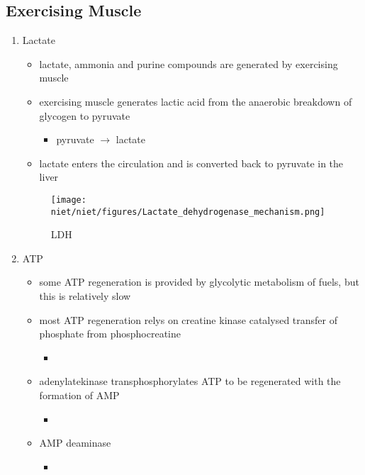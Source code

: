 \documentclass{scrartcl}
\begin{document}
\subsection{Exercising Muscle}
\label{sec:org54d768f}
\begin{enumerate}
\item Lactate
\label{sec:org53e630f}
\begin{itemize}
\item lactate, ammonia and purine compounds are generated by exercising muscle
\item exercising muscle generates lactic acid from the anaerobic breakdown
of glycogen to pyruvate
\begin{itemize}
\item pyruvate \(\to\) lactate
\end{itemize}
\item lactate enters the circulation and is converted back to pyruvate in the liver
\end{itemize}

\begin{figure}[htbp]
\centering
\texttt{[image: niet/niet/figures/Lactate\_dehydrogenase\_mechanism.png]}
\caption{\label{fig:orgd4751dd}LDH}
\end{figure}

\item ATP
\label{sec:orga546307}
\begin{itemize}
\item some ATP regeneration is provided by glycolytic metabolism of fuels,
but this is relatively slow
\item most ATP regeneration relys on creatine kinase catalysed transfer of
phosphate from phosphocreatine

\begin{itemize}
\item {}
\end{itemize}

\item adenylatekinase transphosphorylates ATP to be regenerated with the formation
of AMP

\begin{itemize}
\item {}
\end{itemize}

\item AMP deaminase
\begin{itemize}
\item {}
\end{itemize}


\end{itemize}
\end{enumerate}
\end{document}
